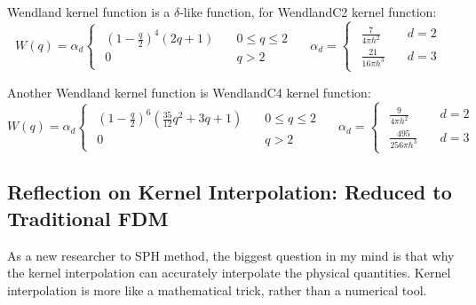 Wendland kernel function is a $\delta$-like function, 
for WendlandC2 kernel function:
\begin{equation}
    W(q)=\alpha_d
    \begin{cases}
        \begin{aligned}
            \left(1-\frac{q}{2}\right)^4(2q+1)\quad &0\leq q \leq 2 \\
            0\quad &q > 2
        \end{aligned}
    \end{cases}\quad
    \alpha_d=
    \begin{cases}
        \begin{aligned}
            \frac{7}{4\pi h^2} \quad &d=2 \\
            \frac{21}{16\pi h^3} \quad &d=3
        \end{aligned}
    \end{cases}
\end{equation}

Another Wendland kernel function is WendlandC4 kernel function:
\begin{equation}
    W(q)=\alpha_d
    \begin{cases}
        \begin{aligned}
            \left(1-\frac{q}{2}\right)^6
            \left(\frac{35}{12}q^2+3q+1\right)\quad &0\leq q \leq 2 \\
            0\quad &q > 2
        \end{aligned}
    \end{cases}\quad
    \alpha_d=
    \begin{cases}
        \begin{aligned}
            \frac{9}{4\pi h^2} \quad &d=2 \\
            \frac{495}{256\pi h^3} \quad &d=3
        \end{aligned}
    \end{cases}
\end{equation}

\subsection{Reflection on Kernel Interpolation: Reduced to Traditional FDM}

As a new researcher to SPH method, 
the biggest question in my mind is that 
why the kernel interpolation can accurately interpolate the physical quantities. 
Kernel interpolation is more like a mathematical trick, rather than a numerical tool.

